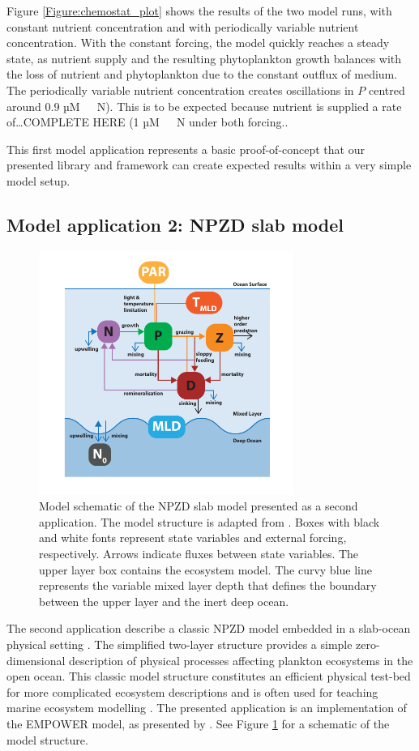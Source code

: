 \documentclass[journal abbreviation, manuscript]{copernicus}
\begin{document}
Figure \ref{Figure:chemostat_plot} shows the results of the two model runs, with constant nutrient concentration and with periodically variable nutrient concentration.
With the constant forcing, the model quickly reaches a steady state, as nutrient supply and the resulting phytoplankton growth balances with the loss of nutrient and phytoplankton due to the constant outflux of medium. The periodically variable nutrient concentration creates oscillations in $P$ centred around 0.9 \unit{µM \ N}). This is to be expected because nutrient is supplied a rate of…COMPLETE HERE (1 \unit{µM \ N} under both forcing..

This first model application represents a basic proof-of-concept that our presented library and framework can create expected results within a very simple model setup.

\subsection{Model application 2: NPZD slab model}
\begin{figure}[t]
\includegraphics[width=8.3cm]{Figures/firstdraft_schematics/02_schematics_EMPOWER.pdf}
\caption{Model schematic of the NPZD slab model presented as a second application. The model structure is adapted
from \citet{Anderson2015c}. Boxes with black and white fonts represent state variables and external forcing, respectively. Arrows indicate fluxes between state variables. The upper layer box contains the ecosystem model. The curvy blue line represents the variable mixed layer depth that defines the boundary between the upper layer and the inert deep ocean.}
\label{Figure:ModelSchematics_2}
\end{figure}

The second application describe a classic NPZD model embedded in a slab-ocean physical setting \citep[e.g.,][]{Evans1985ACycles, Fasham1990a}. The simplified two-layer structure provides a simple zero-dimensional description of physical processes affecting plankton ecosystems in the open ocean. This classic model structure constitutes an efficient physical test-bed for more complicated ecosystem descriptions and is often used for teaching marine ecosystem modelling \citep{Anderson2015c}. The presented application is an implementation of the EMPOWER model, as presented by \citet{Anderson2015c}. See Figure \ref{Figure:ModelSchematics_2} for a schematic of the model structure.
\end{document}
